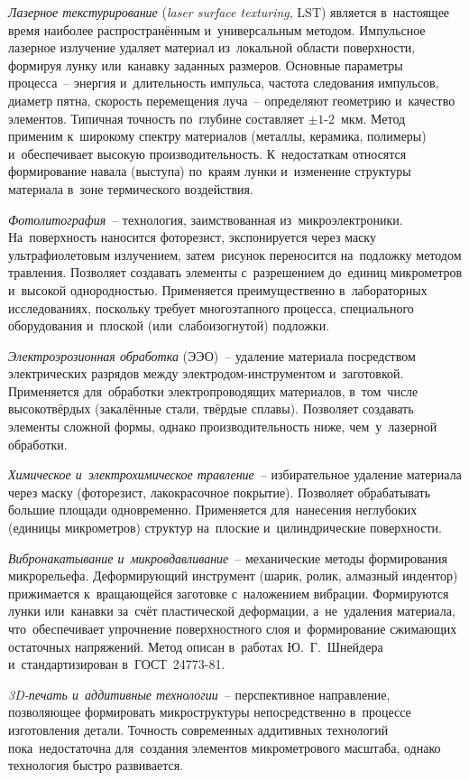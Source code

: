 \textit{Лазерное текстурирование} (\textit{laser surface texturing}, LST) является в~настоящее время наиболее распространённым и~универсальным методом. Импульсное лазерное излучение удаляет материал из~локальной области поверхности, формируя лунку или~канавку заданных размеров. Основные параметры процесса~-- энергия и~длительность импульса, частота следования импульсов, диаметр пятна, скорость перемещения луча~-- определяют геометрию и~качество элементов. Типичная точность по~глубине составляет $\pm 1\text{-}2$~мкм. Метод применим к~широкому спектру материалов (металлы, керамика, полимеры) и~обеспечивает высокую производительность. К~недостаткам относятся формирование навала (выступа) по~краям лунки и~изменение структуры материала в~зоне термического воздействия.

\textit{Фотолитография}~-- технология, заимствованная из~микроэлектроники. На~поверхность наносится фоторезист, экспонируется через маску ультрафиолетовым излучением, затем~рисунок переносится на~подложку методом травления. Позволяет создавать элементы с~разрешением до~единиц микрометров и~высокой однородностью. Применяется преимущественно в~лабораторных исследованиях, поскольку требует многоэтапного процесса, специального оборудования и~плоской (или~слабоизогнутой) подложки.

\textit{Электроэрозионная обработка} (ЭЭО)~-- удаление материала посредством электрических разрядов между электродом-инструментом и~заготовкой. Применяется для~обработки электропроводящих материалов, в~том~числе высокотвёрдых (закалённые стали, твёрдые сплавы). Позволяет создавать элементы сложной формы, однако производительность ниже, чем~у~лазерной обработки.

\textit{Химическое и~электрохимическое травление}~-- избирательное удаление материала через маску (фоторезист, лакокрасочное покрытие). Позволяет обрабатывать большие площади одновременно. Применяется для~нанесения неглубоких (единицы микрометров) структур на~плоские и~цилиндрические поверхности.

\textit{Вибронакатывание и~микровдавливание}~-- механические методы формирования микрорельефа. Деформирующий инструмент (шарик, ролик, алмазный индентор) прижимается к~вращающейся заготовке с~наложением вибрации. Формируются лунки или~канавки за~счёт пластической деформации, а~не~удаления материала, что~обеспечивает упрочнение поверхностного слоя и~формирование сжимающих остаточных напряжений. Метод описан в~работах Ю.~Г.~Шнейдера и~стандартизирован в~ГОСТ~24773-81.

\textit{3D-печать и~аддитивные технологии}~-- перспективное направление, позволяющее формировать микроструктуры непосредственно в~процессе изготовления детали. Точность современных аддитивных технологий пока~недостаточна для~создания элементов микрометрового масштаба, однако технология быстро развивается.

